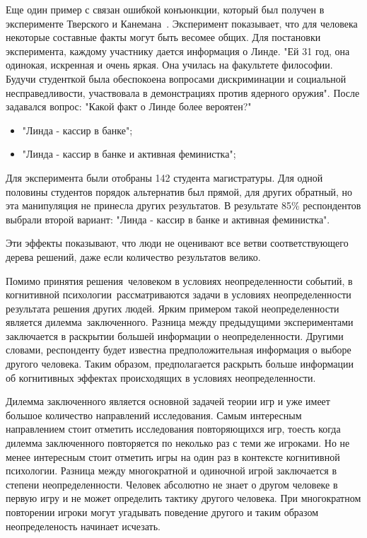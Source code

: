 Еще один пример с связан ошибкой конъюнкции, который был получен в эксперименте Тверского и
Канемана~\citep{tversky1983extensional}. Эксперимент показывает, что для человека некоторые составные
факты могут быть весомее общих. Для постановки эксперимента, каждому участнику дается информация о
Линде. "Ей 31 год, она одинокая, искренная и очень яркая. Она училась на факультете философии.
Будучи студенткой была обеспокоена вопросами дискриминации и социальной несправедливости, участвовала
в демонстрациях против ядерного оружия". После задавался вопрос: "Какой факт о Линде более вероятен?"
\begin{itemize}
    \item "Линда - кассир в банке";
    \item "Линда - кассир в банке и активная феминистка";
\end{itemize}
Для эксперимента были отобраны 142 студента магистратуры. Для одной половины студентов порядок альтернатив
был прямой, для других обратный, но эта манипуляция не принесла других результатов. В результате 85\%
респондентов выбрали второй вариант: "Линда - кассир в банке и активная феминистка"\citep{tversky2004extensional}.

Эти эффекты показывают, что люди не оценивают все ветви соответствующего дерева решений, даже если
количество результатов велико.

Помимо принятия решения~человеком в условиях неопределенности событий, в когнитивной психологии~рассматриваются
задачи в условиях неопределенности результата решения других людей. Ярким примером такой неопределенности
является дилемма~заключенного. Разница между предыдущими экспериментами заключается в раскрытии большей
информации о неопределенности. Другими словами, респонденту будет известна предположительная информация
о выборе другого человека. Таким образом, предполагается раскрыть больше информации об когнитивных эффектах
происходящих в условиях неопределенности.

Дилемма заключенного является основной задачей теории игр и уже имеет большое количество направлений
исследования. Самым интересным направлением стоит отметить исследования повторяющихся игр, тоесть когда
дилемма заключенного повторяется по неколько раз с теми же игроками. Но не менее интересным стоит
отметить игры на один раз в контексте когнитивной психологии. Разница между многократной и одиночной
игрой заключается в степени неопределенности. Человек абсолютно не знает о другом человеке в первую игру и
не может определить тактику другого человека. При многократном повторении игроки могут угадывать
поведение другого и таким образом неопределеность начинает исчезать.

